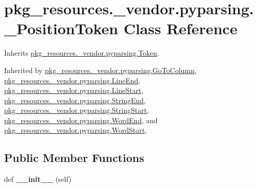 \hypertarget{classpkg__resources_1_1__vendor_1_1pyparsing_1_1___position_token}{}\section{pkg\+\_\+resources.\+\_\+vendor.\+pyparsing.\+\_\+\+Position\+Token Class Reference}
\label{classpkg__resources_1_1__vendor_1_1pyparsing_1_1___position_token}


Inherits \hyperlink{classpkg__resources_1_1__vendor_1_1pyparsing_1_1_token}{pkg\+\_\+resources.\+\_\+vendor.\+pyparsing.\+Token}.



Inherited by \hyperlink{classpkg__resources_1_1__vendor_1_1pyparsing_1_1_go_to_column}{pkg\+\_\+resources.\+\_\+vendor.\+pyparsing.\+Go\+To\+Column}, \hyperlink{classpkg__resources_1_1__vendor_1_1pyparsing_1_1_line_end}{pkg\+\_\+resources.\+\_\+vendor.\+pyparsing.\+Line\+End}, \hyperlink{classpkg__resources_1_1__vendor_1_1pyparsing_1_1_line_start}{pkg\+\_\+resources.\+\_\+vendor.\+pyparsing.\+Line\+Start}, \hyperlink{classpkg__resources_1_1__vendor_1_1pyparsing_1_1_string_end}{pkg\+\_\+resources.\+\_\+vendor.\+pyparsing.\+String\+End}, \hyperlink{classpkg__resources_1_1__vendor_1_1pyparsing_1_1_string_start}{pkg\+\_\+resources.\+\_\+vendor.\+pyparsing.\+String\+Start}, \hyperlink{classpkg__resources_1_1__vendor_1_1pyparsing_1_1_word_end}{pkg\+\_\+resources.\+\_\+vendor.\+pyparsing.\+Word\+End}, and \hyperlink{classpkg__resources_1_1__vendor_1_1pyparsing_1_1_word_start}{pkg\+\_\+resources.\+\_\+vendor.\+pyparsing.\+Word\+Start}.

\subsection*{Public Member Functions}
\begin{DoxyCompactItemize}
\item 
\mbox{\label{classpkg__resources_1_1__vendor_1_1pyparsing_1_1___position_token_a08f2f32d2574e109ba2cedaad6ec8073}} 
def {\bfseries \+\_\+\+\_\+init\+\_\+\+\_\+} (self)
\end{DoxyCompactItemize}
